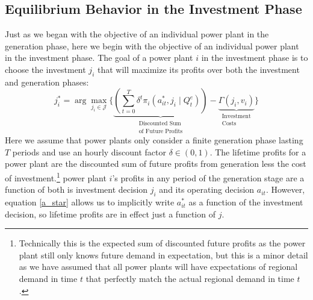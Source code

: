 \subsection{Equilibrium Behavior in the Investment Phase}

Just as we began with the objective of an individual power plant in the generation phase, here we begin with the objective of an individual power plant in the investment phase. The goal of a power plant $i$ in the investment phase is to choose the investment $j_i$ that will maximize its profits over both the investment and generation phases:
\begin{equation}
    j_i^* = \arg\max_{j_i \in \mathcal{J}} \biggl\{ \underbrace{\left(\sum_{t = 0}^T \delta^t \pi_i (a_{it}^*, j_i\mid Q_t^e) \right)}_{\substack{\text{Discounted Sum}\\ \text{of Future Profits}}} - \underbrace{\Gamma(j_i, v_i)}_{\substack{\text{Investment}\\ \text{Costs}}} \biggr\}
\end{equation}
Here we assume that power plants only consider a finite generation phase lasting $T$ periods and use an hourly discount factor $\delta \in (0, 1)$. The lifetime profits for a power plant are the discounted sum of future profits from generation less the cost of investment.\footnote{Technically this is the expected sum of discounted future profits as the power plant still only knows future demand in expectation, but this is a minor detail as we have assumed that all power plants will have expectations of regional demand in time $t$ that perfectly match the actual regional demand in time $t$.} power plant $i$'s profits in any period of the generation stage are a function of both is investment decision $j_i$ and its operating decision $a_{it}$. However, equation \eqref{a_star} allows us to implicitly write $a_{it}^*$ as a function of the investment decision, so lifetime profits are in effect just a function of $j$. 

